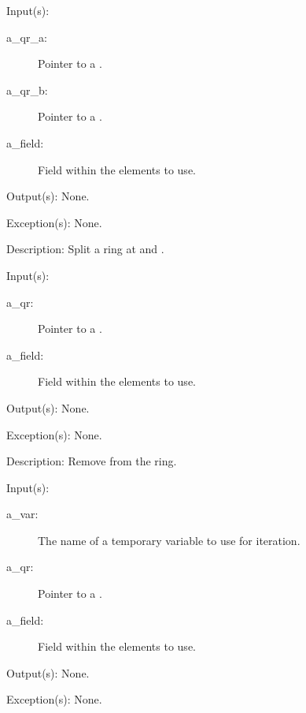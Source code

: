\begin{capi}
\begin{capilist}
	\item[Input(s): ]
		\begin{description}\item[]
		\item[a\_qr\_a: ]
			Pointer to a .
		\item[a\_qr\_b: ]
			Pointer to a .
		\item[a\_field: ]
			Field within the  elements to use.
		\end{description}
	\item[Output(s): ] None.
	\item[Exception(s): ] None.
	\item[Description: ]
		Split a ring at  and .
	\end{capilist}
\label{qr_remove}
	\begin{capilist}
	\item[Input(s): ]
		\begin{description}\item[]
		\item[a\_qr: ]
			Pointer to a .
		\item[a\_field: ]
			Field within the  elements to use.
		\end{description}
	\item[Output(s): ] None.
	\item[Exception(s): ] None.
	\item[Description: ]
		Remove  from the ring.
	\end{capilist}
\label{qr_foreach}
	\begin{capilist}
	\item[Input(s): ]
		\begin{description}\item[]
		\item[a\_var: ]
			The name of a temporary variable to use for iteration.
		\item[a\_qr: ]
			Pointer to a \classname{qr}.
		\item[a\_field: ]
			Field within the  elements to use.
		\end{description}
	\item[Output(s): ] None.
	\item[Exception(s): ] None.

\end{capilist}
\end{capi}
